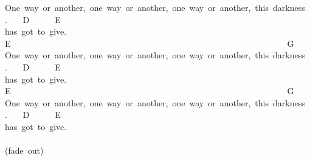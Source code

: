 {One\ way\ or\ another,\ one\ way\ or\ another,\ one\ way\ or\ another,\ this\ darkness\\
. \ \ \ D\ \ \ \ \ \ E\\
has\ got\ to\ give.\\
E\ \ \ \ \ \ \ \ \ \ \ \ \ \ \ \ \ \ \ \ \ \ \ \ \ \ \ \ \ \ \ \ \ \ \ \ \ \ \ \ \ \ \ \ \ \ \ \ \ \ \ \ \ \ \ \ \ \ \ \ \ \ \ \ \ G\\
One\ way\ or\ another,\ one\ way\ or\ another,\ one\ way\ or\ another,\ this\ darkness\\
. \ \ \ D\ \ \ \ \ \ E\\
has\ got\ to\ give.\\
E\ \ \ \ \ \ \ \ \ \ \ \ \ \ \ \ \ \ \ \ \ \ \ \ \ \ \ \ \ \ \ \ \ \ \ \ \ \ \ \ \ \ \ \ \ \ \ \ \ \ \ \ \ \ \ \ \ \ \ \ \ \ \ \ \ G\\
One\ way\ or\ another,\ one\ way\ or\ another,\ one\ way\ or\ another,\ this\ darkness\\
. \ \ \ D\ \ \ \ \ \ E\\
has\ got\ to\ give.\\
\\
(fade\ out)\ }
